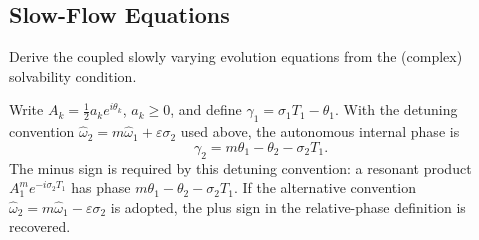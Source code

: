 \documentclass[11pt]{article}
\newenvironment{assignmentinstruction}{\par\begingroup\color{blue}}{\par\endgroup}
\begin{document}
\subsection{Slow-Flow Equations}
\begin{assignmentinstruction}
Derive the coupled slowly varying evolution equations from the (complex) solvability condition.
\end{assignmentinstruction}
Write $A_k=\tfrac12a_ke^{i\theta_k}$, $a_k\ge0$, and define $\gamma_1=\sigma_1T_1-\theta_1$. With the detuning convention $\hat\omega_2=m\hat\omega_1+\varepsilon\sigma_2$ used above, the autonomous internal phase is
\begin{equation}\label{eq:relative-phase}
\gamma_2=m\theta_1-\theta_2-\sigma_2T_1.
\end{equation}
The minus sign is required by this detuning convention: a resonant product $A_1^m e^{-i\sigma_2T_1}$ has phase $m\theta_1-\theta_2-\sigma_2T_1$. If the alternative convention $\hat\omega_2=m\hat\omega_1-\varepsilon\sigma_2$ is adopted, the plus sign in the relative-phase definition is recovered.
\end{document}
